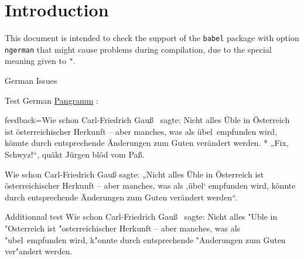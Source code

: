 \documentclass{article}
\def\myquestiontext{ \underline{Pangramm} :}
\def\pangramme{\glqq Fix, Schwyz!\grqq, qu\"akt J\"urgen bl\"od vom Pa\ss.}
\def\pangrammeother{Wie schon Carl-Friedrich Gau\ss\ %
  sagte: \glqq Nicht alles \"Uble in \"Osterreich ist 
  \"osterreichischer Herkunft -- aber manches, was als \glq 
  \"ubel\grq\ empfunden wird, k\"onnte durch entsprechende 
  \"Anderungen zum Guten ver\"andert werden\grqq.}
\def\myfeedback{}
\def\myquestiontext{ \underline{Pangramm} :}
\def\pangramme{„Fix, Schwyz!“, quäkt Jürgen blöd vom Paß.}
\def\pangrammeother{Wie schon Carl-Friedrich Gauß sagte: 
  „Nicht alles Üble in Österreich ist österreichischer 
  Herkunft – aber manches, was als ‚übel‘ empfunden wird, 
  könnte durch entsprechende Änderungen zum Guten verändert 
  werden“.}
\def\myfeedback{Wie schon Carl-Friedrich Gau\ss\ %
  sagte: \glqq Nicht alles \"Uble in \"Osterreich ist 
  \"osterreichischer Herkunft -- aber manches, was als \glq 
  \"ubel\grq\ empfunden wird, k\"onnte durch entsprechende 
  \"Anderungen zum Guten ver\"andert werden\grqq.}
\begin{document}
\section*{Introduction}

This document is intended to check the support of the \texttt{babel} package 
with option \texttt{ngerman} that might cause problems during compilation, due 
to the special meaning given to \verb|"|.

\begin{quiz}[points=1.0]{German Issues}
\begin{multi}[feedback={}]{Test German}
\myquestiontext
\item[feedback={\myfeedback}]* \pangramme
\item \pangrammeother
\end{multi}

\ifTUTeX
  \begin{description}{Additionnal test}
    Wie schon Carl-Friedrich Gau\ss\ %
    sagte: \glqq Nicht alles "Uble in "Osterreich ist 
    "osterreichischer Herkunft -- aber manches, was als \glq 
    "ubel\grq\ empfunden wird, k"onnte durch entsprechende 
    "Anderungen zum Guten ver"andert werden\grqq.
  \end{description}
\fi

\end{quiz}
\end{document}
